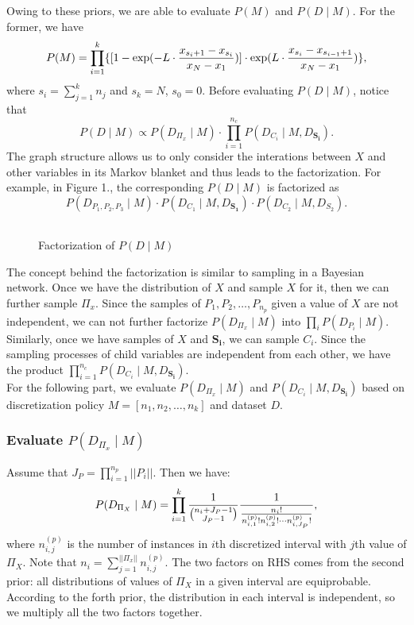 Owing to these priors, we are able to evaluate $P(M)$ and $P(D \mid M)$. For the former, we have
\begin{equation}
P(M) = \prod_{i=1}^k \{ [1 - {\exp(- L \cdot {{x_{s_i+1} - x_{s_i}}\over{x_N - x_1}})}] \cdot \exp(L \cdot {{x_{s_{i}} - x_{s_{i-1} + 1}}\over{x_N - x_1}}) \},
\end{equation}
where $s_i = \sum_{j=1}^k n_j$ and $s_k = N$, $s_0 = 0$. Before evaluating $P(D \mid M)$, notice that
\begin{equation}
P(D \mid M) \propto P(D_{\Pi_x} \mid M) \cdot \prod_{i = 1}^{n_c} P(D_{C_i} \mid M, D_{\boldsymbol{S_i}}).
\end{equation}
The graph structure allows us to only consider the interations between $X$ and other variables in its Markov blanket and thus leads to the factorization. For example, in Figure 1., the corresponding $P(D \mid M)$ is factorized as
\begin{equation}
P(D_{ P_1,P_2,P_3 } \mid M) \cdot P( D_{ C_1 } \mid M,D_{\boldsymbol{S_1}}) \cdot P(D_{C_2} \mid M,D_{ S_2  }).
\end{equation} 

\begin{figure}[ht]
    \begin{tabular}{cc}
      
    \end{tabular}
  \caption{Factorization of $P(D \mid M)$}
\end{figure}


The concept behind the factorization is similar to sampling in a Bayesian network. Once we have the distribution of $X$ and sample $X$ for it, then we can further sample $\Pi_x$. Since the samples of $P_1,P_2,\ldots,P_{n_p}$ given a value of $X$ are not independent, we can not further factorize $P(D_{\Pi_x} \mid M)$ into $\prod_i P(D_{P_i} \mid M)$. Similarly, once we have samples of $X$ and $\boldsymbol{S_i}$, we can sample $C_i$. Since the sampling processes of child variables are independent from each other, we have the product $\prod_{i = 1}^{n_c} P(D_{C_i} \mid M, D_{\boldsymbol{S_i}})$.\\

For the following part, we evaluate $P(D_{\Pi_x} \mid M)$  and $P(D_{C_i} \mid M, D_{\boldsymbol{S_i}})$ based on discretization policy $M = [n_1,n_2,\ldots,n_k]$ and dataset $D$.
\subsubsection{Evaluate $P(D_{\Pi_x} \mid M)$}
Assume that $J_P = \prod_{i=1}^{n_p} || P_i ||$. Then we have:
\begin{equation}
P(D_{\Pi_X} \mid M) = \prod_{i=1}^k  {{1}\over{{n_i + J_P - 1}\choose{J_P -1}}}
{{1}\over{ {{{n}_i}!}\over{ {n^{(p)}_{i,1} !} {n^{(p)}_{i,2} !} \cdots {n^{(p)}_{i,J_P} !}}  }},
\end{equation}
where $n^{(p)}_{i,j}$ is the number of instances in $i$th discretized interval with $j$th value of $\Pi_X$. Note that $n_i = \sum_{j=1}^{|| \Pi_x ||} n^{(p)}_{i,j}$. The two factors on RHS comes from the second prior: all distributions of values of $\Pi_X$ in a given interval are equiprobable. According to the forth prior, the distribution in each interval is independent, so we multiply all the two factors together.

